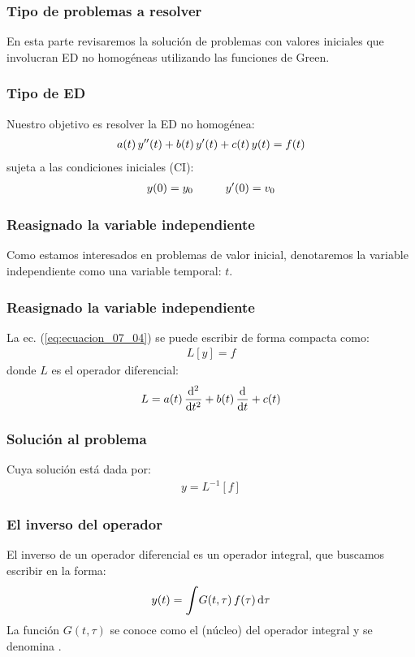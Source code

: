 \documentclass[12pt]{beamer}
\begin{document}
\begin{frame}
\frametitle{Tipo de problemas a resolver}
En esta parte revisaremos la solución de problemas con valores iniciales que involucran ED no homogéneas utilizando las funciones de Green.
\end{frame}
\begin{frame}
\frametitle{Tipo de ED}
Nuestro objetivo es resolver la ED no homogénea:
\pause
\begin{align}
a (t) \, {y}^{\prime \prime} (t) + b (t) \, {y}^{\prime} (t) + c (t) \, y (t) = f (t)
\label{eq:ecuacion_07_04}
\end{align}
\pause
sujeta a las condiciones iniciales (CI):
\pause
\begin{align*}
y (0) = y_{0} \hspace{1cm} {y}^{\prime} (0) = v_{0}
\end{align*}
\end{frame}
\begin{frame}
\frametitle{Reasignado la variable independiente}
Como estamos interesados en problemas de valor inicial, denotaremos la variable independiente como una variable temporal: $t$.
\end{frame}
\begin{frame}
\frametitle{Reasignado la variable independiente}
La ec. (\ref{eq:ecuacion_07_04}) se puede escribir de forma compacta como:
\pause
\begin{align*}
L [y] = f
\end{align*}
\pause
donde $L$ es el operador diferencial:
\begin{align*}
L = a (t) \, \dv[2]{t} + b (t) \, \dv{t} + c (t) 
\end{align*}
\end{frame}
\begin{frame}
\frametitle{Solución al problema}
Cuya solución está dada por:
\pause
\begin{align*}
y = L^{-1} [f]
\end{align*}
\end{frame}
\begin{frame}
\frametitle{El inverso del operador}
El inverso de un operador diferencial es un operador integral, que buscamos escribir en la forma:
\pause
\begin{align*}
y (t) = \scaleint{6ex} G (t, \tau) \, f(\tau) \dd{\tau}
\end{align*}
\pause
La función $G (t, \tau)$ se conoce como el   (núcleo) del operador integral y  se denomina .
\end{frame}
\end{document}

